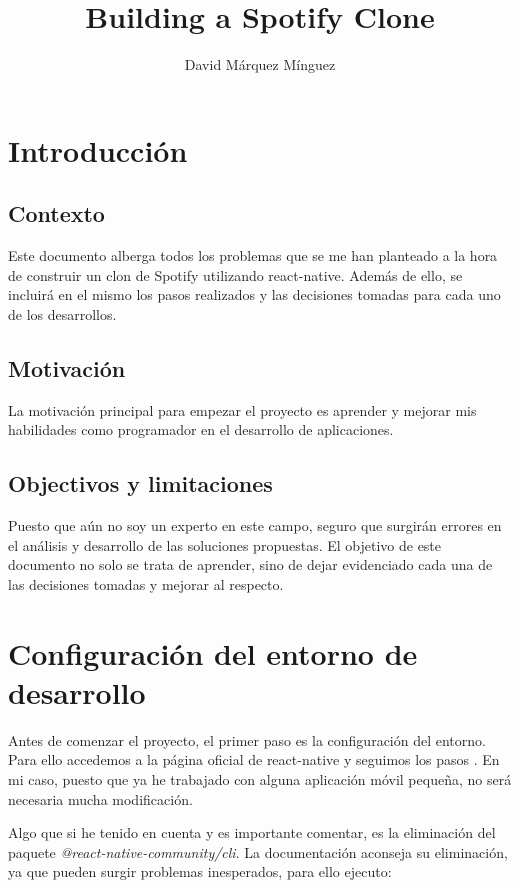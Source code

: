 \documentclass[a4paper, 11pt]{article}
\title{Building a Spotify Clone}
\author{David Márquez Mínguez}
\begin{document}
\maketitle
\tableofcontents

\pagebreak
\section{Introducción}

\subsection{Contexto}

Este documento alberga todos los problemas que se me han planteado a la hora de construir un clon de Spotify utilizando react-native. Además de ello, se incluirá en el mismo
los pasos realizados y las decisiones tomadas para cada uno de los desarrollos.

\subsection{Motivación}

La motivación principal para empezar el proyecto es aprender y mejorar mis habilidades como programador en el desarrollo de aplicaciones.

\subsection{Objectivos y limitaciones}

Puesto que aún no soy un experto en este campo, seguro que surgirán errores en el análisis y desarrollo de las soluciones propuestas. El objetivo de este documento no solo se 
trata de aprender, sino de dejar evidenciado cada una de las decisiones tomadas y mejorar al respecto.


\pagebreak
\section{Configuración del entorno de desarrollo}

Antes de comenzar el proyecto, el primer paso es la configuración del entorno. Para ello accedemos a la página oficial de react-native y seguimos los pasos 
\cite{setup-development-environment}. En mi caso, puesto que ya he trabajado con alguna aplicación móvil pequeña, no será necesaria mucha modificación.

Algo que si he tenido en cuenta y es importante comentar, es la eliminación del paquete \emph{@react-native-community/cli}. La documentación aconseja su eliminación, 
ya que pueden surgir problemas inesperados, para ello ejecuto:
\end{document}
